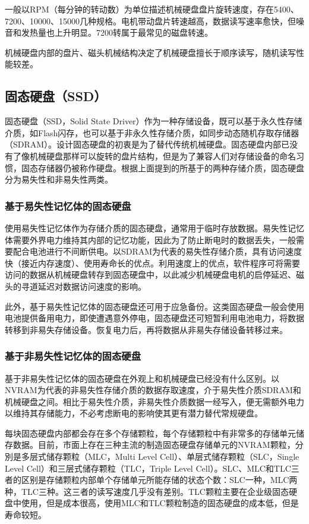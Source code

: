 一般以RPM（每分钟的转动数）为单位描述机械硬盘盘片旋转速度，存在5400、7200、10000、15000几种规格。电机带动盘片转速越高，数据读写速率愈快，但噪音和发热量也上升明显。7200转属于最常见的磁盘转速。

机械硬盘内部的盘片、磁头机械结构决定了机械硬盘擅长于顺序读写，随机读写性能较差。

\subsection{固态硬盘（SSD）}
固态硬盘\cite{ssd2009}（SSD，Solid State Driver）作为一种存储设备，既可以基于永久性存储介质，如Flash闪存，也可以基于非永久性存储介质，如同步动态随机存取存储器（SDRAM）。设计固态硬盘的初衷是为了替代传统机械硬盘。固态硬盘内部已没有了像机械硬盘那样可以旋转的盘片结构，但是为了兼容人们对存储设备的命名习惯，固态存储器仍被称作硬盘。根据上面提到的所基于的两种存储介质，固态硬盘分为易失性和非易失性两类。

\subsubsection{基于易失性记忆体的固态硬盘}

使用易失性记忆体作为存储介质的固态硬盘，通常用于临时存放数据。易失性记忆体需要外界电力维持其内部的记忆功能，因此为了防止断电时的数据丢失，一般需要配合电池进行不间断供电。以SDRAM为代表的易失性存储介质，具有访问速度快（接近内存速度）、使用寿命长的优点。利用速度上的优点，软件程序可将需要访问的数据从机械硬盘转存到固态硬盘中，以此减少机械硬盘电机的启停延迟、磁头的寻道延迟对数据访问速度的影响。

此外，基于易失性记忆体的固态硬盘还可用于应急备份。这类固态硬盘一般会使用电池提供备用电力，即使遭遇意外停电，固态硬盘还可短暂利用电池电力，将数据转移到非易失存储设备。恢复电力后，再将数据从非易失存储设备转移过来。

\subsubsection{基于非易失性记忆体的固态硬盘}

基于非易失性记忆体的固态硬盘在外观上和机械硬盘已经没有什么区别。以NVRAM为代表的非易失性存储介质的数据存取速度，介于易失性介质SDRAM和机械硬盘之间。相比于易失性介质，非易失性介质数据一经写入，便无需额外电力以维持其存储能力，不必考虑断电的影响使其更有潜力替代常规硬盘。

每块固态硬盘内部都会存在多个存储颗粒，每个存储颗粒中有非常多的存储单元储存数据。目前，市面上存在三种主流的制造固态硬盘存储单元的NVRAM颗粒，分別是多层式储存颗粒（MLC，Multi Level Cell）、单层式储存颗粒（SLC，Single Level Cell）和三层式储存颗粒（TLC，Triple Level Cell）。SLC、MLC和TLC三者的区别是存储颗粒内部单个存储单元所能存储的状态个数：SLC一种，MLC两种，TLC三种。这三者的读写速度几乎没有差别。TLC颗粒主要在企业级固态硬盘中使用，但是成本很高，使用MLC和TLC颗粒制造的固态硬盘的成本低，但是寿命较短。

